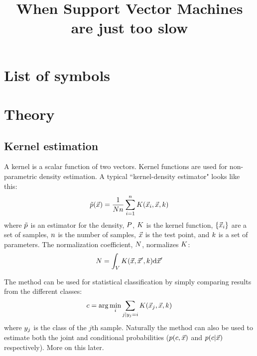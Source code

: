 \documentclass[11pt]{article}
\title{When Support Vector Machines are just too slow}
\begin{document}


\tableofcontents

\section*{List of symbols}



\section{Theory}

\subsection{Kernel estimation}

A kernel is a scalar function of two vectors. Kernel functions are used for 
non-parametric density estimation. A typical ``kernel-density estimator"
looks like this:
\begin{equation}
	\tilde p(\vec {x}) = \frac {1}{N n} \sum_{i=1}^n K(\vec {x}_i, \vec {x}, k)
\end{equation}
where $\tilde p$ is an estimator for the density, $P$, 
$K$ is the kernel function,
$\lbrace \vec {x}_i \rbrace$ are a set of samples, 
$n$ is the number of samples,
$\vec {x}$ is the test point,
and $k$ is a set of parameters. 
The normalization coefficient, $N$, normalizes $K$:
\begin{equation}
	N = \int_V K(\vec {x}, \vec {x}^\prime, k) \mathrm d \vec {x}^\prime
\end{equation}

The method can be used for statistical classification by simply comparing
results from the different classes:
\begin{equation}
	c = \arg \min_i \sum_{j|y_j = i} K(\vec {x}_j, \vec {x}, k)
\end{equation}
where $y_j$ is the class of the $j$th sample. Naturally the method can also
be used to estimate both the joint and conditional probabilities 
($p(c, \vec x)$ and $p(c |\vec x)$ respectively). 
More on this later.
\end{document}
